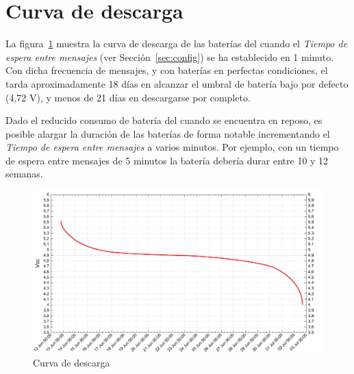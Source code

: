 \section{Curva de descarga}
\label{app:curva-descarga}

La figura~\ref{fig:discharge-curve} muestra la curva de descarga de las baterías del \MEE cuando el \emph{Tiempo de espera entre mensajes} (ver Sección~\ref{sec:config}) se ha establecido en 1 minuto.
Con dicha frecuencia de mensajes, y con baterías en perfectas condiciones, el \ME tarda aproximadamente 18 días en alcanzar el umbral de batería bajo por defecto (4,72 V), y menos de 21 días en descargarse por completo. 

Dado el reducido consumo de batería del \MEE cuando se encuentra en reposo, es posible alargar la duración de las baterías de forma notable incrementando el \emph{Tiempo de espera entre mensajes} a varios minutos. Por ejemplo, con un tiempo de espera entre mensajes de 5 minutos la batería debería durar entre 10 y 12 semanas.

\begin{figure}[H]
  \centering
  \includegraphics[width=1\columnwidth]{images/discharge-curve}
  \caption{Curva de descarga}
  \label{fig:discharge-curve}
\end{figure}

